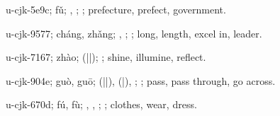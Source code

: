 \begin{multicols}{2}
{\cjkgGlue{}u-cjk-5e9c; fǔ; \cjkgGlue{}, \cjkgGlue{}; \cjkgGlue{}; prefecture, prefect, government.

\cjkgGlue{}u-cjk-9577; cháng, zhǎng; \cjkgGlue{}\cjkgGlue{}\cjkgGlue{}, \cjkgGlue{}; \cjkgGlue{}; long, length, excel in, leader.

\cjkgGlue{}u-cjk-7167; zhào; \cjkgGlue{}\cjkgGlue{}(\cjkgGlue{}|\cjkgGlue{}|\cjkgGlue{}); \cjkgGlue{}; shine, illumine, reflect.

\cjkgGlue{}u-cjk-904e; guò, guō; \cjkgGlue{}\cjkgGlue{}(\cjkgGlue{}|\cjkgGlue{}|\cjkgGlue{}), \cjkgGlue{}\cjkgGlue{}(\cjkgGlue{}|\cjkgGlue{}), \cjkgGlue{}\cjkgGlue{}\cjkgGlue{}; \cjkgGlue{}; pass, pass through, go across.

\cjkgGlue{}u-cjk-670d; fú, fù; \cjkgGlue{}, \cjkgGlue{}, \cjkgGlue{}; \cjkgGlue{}; clothes, wear, dress.

}
\end{multicols}
